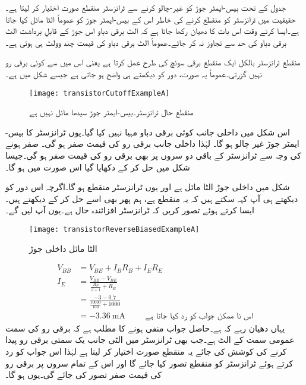 	جدول کے تحت بیس-ایمٹر  جوڑ کو غیر-چالو کرنے سے ٹرانزسٹر منقطع صورت اختیار کر لیتا ہے۔حقیقیت میں ٹرانزسٹر کو منقطع کرنے کی خاطر اس کے بیس-ایمٹر  جوڑ کو عموماً الٹا مائل کیا جاتا ہے۔ایسا کرتے وقت اس بات کا دھیان رکھا جاتا ہے کہ الٹ برقی دباو اس جوڑ کے قابلِ برداشت الٹ برقی دباو  کی حد سے تجاوز نہ کر جائے۔عموماً الٹ برقی دباو کی قیمت چند وولٹ  ہی ہوتی ہے۔ 

منقطع ٹرانزسٹر بالکل ایک منقطع برقی سوئچ کی طرح عمل کرتا ہے یعنی اس میں سے  کوئی برقی رو نہیں گزرتی۔عموماً یہ صورت، دور کو دیکھتے ہی واضح ہو جاتی ہے جیسے شکل  میں ہے۔
\begin{figure}
\centering
\texttt{[image: transistorCutoffExampleA]}
\caption{منقطع حال ٹرانزسٹر۔بیس-ایمٹر  جوڑ سیدھا مائل نہیں ہے}
\label{شکل_منقطع_ٹرانزسٹر_کی_مثال}
\end{figure}
اس شکل میں داخلی جانب کوئی برقی دباو مہیا نہیں کیا گیا۔یوں ٹرانزسٹر کا بیس-ایمٹر  جوڑ غیر چالو ہو گا۔ لہٰذا داخلی جانب برقی رو  کی قیمت صفر ہو گی۔  صفر ہونے کی وجہ سے ٹرانزسٹر کے باقی دو سروں پر بھی برقی رو کی قیمت صفر ہو گی۔جیسا شکل میں حل کر کے دکھایا گیا اس صورت میں  ہو گا۔

شکل   میں داخلی جوڑ الٹا مائل ہے اور یوں ٹرانزسٹر منقطع ہو گا۔اگرچہ اس دور کو دیکھتے ہی آپ کہہ سکتے ہیں کہ یہ منقطع ہے، ہم پھر بھی اسے حل کر کے دیکھتے ہیں۔ایسا کرتے ہوئے تصور کریں کہ ٹرانزسٹر افزائندہ حال ہے۔یوں آپ  لیں گے۔
\begin{figure}
\centering
\texttt{[image: transistorReverseBiasedExampleA]}
\caption{ الٹا مائل داخلی جوڑ}
\label{شکل_الٹا_مائل_داخلی_جوڑ}
\end{figure}
%
\begin{align*}
V_{BB}&=V_{BE}+I_B R_B +I_E R_E\\
I_E &=\frac{V_{BB}-V_{BE}}{\frac{R_B}{\beta+1}+R_E}\\
&=\frac{-3-0.7}{\frac{10000}{100}+1000}\\
&=\SI{-3.36}{\milli \ampere} \hspace{1cm} \textrm{اس نا ممکن جواب کو رد کیا جاتا ہے}
\end{align*}
یہاں دھیان رہے کہ  ہے۔حاصل جواب منفی ہونے کا مطلب ہے کہ برقی رو کی سمت عمومی سمت کے الٹ ہے۔جب بھی ٹرانزسٹر میں الٹی جانب یک سمتی برقی رو پیدا کرنے کی کوشش کی جائے یہ منقطع صورت اختیار کر لیتا ہے لہٰذا اس جواب کو رد کرتے ہوئے ٹرانزسٹر کو منقطع تصور کیا جائے گا اور اس کے تمام سروں پر برقی رو کی قیمت صفر تصور کی جائے گی۔یوں  ہو گا۔

